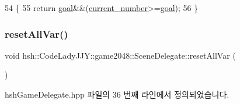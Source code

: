 \begin{DoxyCode}
54                                           \{
55                     \textcolor{keywordflow}{return} \hyperlink{classhsh_1_1_code_lady_j_j_y_1_1game2048_1_1_scene_delegate_a837886106e5ac017e4f57d8f56943e20}{goal}&&(\hyperlink{classhsh_1_1_code_lady_j_j_y_1_1game2048_1_1_scene_delegate_af013ba6abf67944a36a117be7c97f0d3}{current\_number}>=\hyperlink{classhsh_1_1_code_lady_j_j_y_1_1game2048_1_1_scene_delegate_a837886106e5ac017e4f57d8f56943e20}{goal});
56                 \}
\end{DoxyCode}
\mbox{\label{classhsh_1_1_code_lady_j_j_y_1_1game2048_1_1_scene_delegate_a07cb2b429428f54e4291c4c8dc63b4ac}} 
\subsubsection{\texorpdfstring{reset\+All\+Var()}{resetAllVar()}}
{\footnotesize\ttfamily void hsh\+::\+Code\+Lady\+J\+J\+Y\+::game2048\+::\+Scene\+Delegate\+::reset\+All\+Var (\begin{DoxyParamCaption}{ }\end{DoxyParamCaption})\hspace{0.3cm}{\ttfamily [inline]}}



hsh\+Game\+Delegate.\+hpp 파일의 36 번째 라인에서 정의되었습니다.


